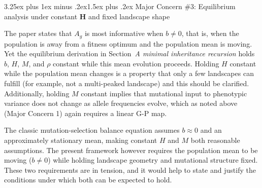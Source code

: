 \documentclass[11pt,a4paper]{article}
\makeatletter
\renewcommand{\subsection}{\@startsection{subsection}{2}{0pt}%
  {3.25ex plus 1ex minus .2ex}{1.5ex plus .2ex}%
  {\large\bfseries}}
\newcommand{\mat}[1]{\ensuremath{\mathbf{#1}}}
\makeatother
\begin{document}
\subsection{\texorpdfstring{Major Concern \#3: Equilibrium analysis under constant $\mat{H}$ and fixed landscape shape}{Major Concern \#3: Equilibrium analysis under constant H and fixed landscape shape}}

\begin{revquote}
The paper states that $A_g$ is most informative when $b \neq 0$, that is, when the population is away from a fitness optimum and the population mean is moving. Yet the equilibrium derivation in Section~\textit{A minimal inheritance recursion} holds $b$, $H$, $M$, and $\rho$ constant while this mean evolution proceeds. Holding $H$ constant while the population mean changes is a property that only a few landscapes can fulfill (for example, not a multi-peaked landscape) and this should be clarified. Additionally, holding $M$ constant implies that mutational input to phenotypic variance does not change as allele frequencies evolve, which as noted above (Major Concern 1) again requires a linear G-P map.

The classic mutation-selection balance equation assumes $b \approx 0$ and an approximately stationary mean, making constant $H$ and $M$ both reasonable assumptions. The present framework however requires the population mean to be moving ($b \neq 0$) while holding landscape geometry and mutational structure fixed. These two requirements are in tension, and it would help to state and justify the conditions under which both can be expected to hold.
\end{revquote}
\end{document}
